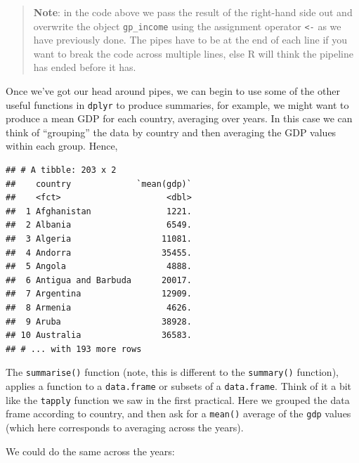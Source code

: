 \documentclass[]{book}
\newenvironment{Shaded}{\begin{snugshade}}{\end{snugshade}}
\newcommand{\KeywordTok}[1]{\textcolor[rgb]{0.13,0.29,0.53}{\textbf{{#1}}}}
\newcommand{\StringTok}[1]{\textcolor[rgb]{0.31,0.60,0.02}{{#1}}}
\newcommand{\NormalTok}[1]{{#1}}
\theoremstyle{definition}
\theoremstyle{definition}
\theoremstyle{definition}
\theoremstyle{remark}
\begin{document}
\begin{quote}
\textbf{Note}: in the code above we pass the result of the right-hand
side out and overwrite the object \texttt{gp\_income} using the
assignment operator \texttt{\textless{}-} as we have previously done.
The pipes have to be at the end of each line if you want to break the
code across multiple lines, else R will think the pipeline has ended
before it has.
\end{quote}

Once we've got our head around pipes, we can begin to use some of the
other useful functions in \texttt{dplyr} to produce summaries, for
example, we might want to produce a mean GDP for each country, averaging
over years. In this case we can think of ``grouping'' the data by
country and then averaging the GDP values within each group. Hence,

\begin{Shaded}
\end{Shaded}

\begin{verbatim}
## # A tibble: 203 x 2
##    country             `mean(gdp)`
##    <fct>                     <dbl>
##  1 Afghanistan               1221.
##  2 Albania                   6549.
##  3 Algeria                  11081.
##  4 Andorra                  35455.
##  5 Angola                    4888.
##  6 Antigua and Barbuda      20017.
##  7 Argentina                12909.
##  8 Armenia                   4626.
##  9 Aruba                    38928.
## 10 Australia                36583.
## # ... with 193 more rows
\end{verbatim}

The \texttt{summarise()} function (note, this is different to the
\texttt{summary()} function), applies a function to a
\texttt{data.frame} or subsets of a \texttt{data.frame}. Think of it a
bit like the \texttt{tapply} function we saw in the first practical.
Here we grouped the data frame according to country, and then ask for a
\texttt{mean()} average of the \texttt{gdp} values (which here
corresponds to averaging across the years).

We could do the same across the years:

\begin{Shaded}
\end{Shaded}
\end{document}
